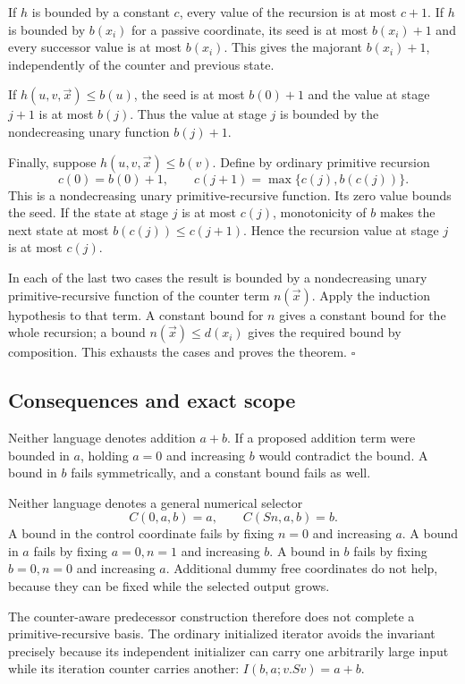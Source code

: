 \documentclass[11pt,letterpaper]{article}
\theoremstyle{definition}\newtheorem{definition}[theorem]{Definition}
\theoremstyle{remark}\newtheorem{remark}[theorem]{Remark}
\begin{document}
If $h$ is bounded by a constant $c$, every value of the recursion is
at most $c+1$.  If $h$ is bounded by $b(x_i)$ for a passive coordinate,
its seed is at most $b(x_i)+1$ and every successor value is at most
$b(x_i)$.  This gives the majorant $b(x_i)+1$, independently of the
counter and previous state.

If $h(u,v,\vec x)\leq b(u)$, the seed is at most $b(0)+1$ and
the value at stage $j+1$ is at most $b(j)$.  Thus the value at stage
$j$ is bounded by the nondecreasing unary function $b(j)+1$.

Finally, suppose $h(u,v,\vec x)\leq b(v)$.  Define by ordinary
primitive recursion
\[
 c(0)=b(0)+1,\qquad
 c(j+1)=\max\{c(j),b(c(j))\}.
\]
This is a nondecreasing unary primitive-recursive function.  Its zero
value bounds the seed.  If the state at stage $j$ is at most $c(j)$,
monotonicity of $b$ makes the next state at most $b(c(j))\leq c(j+1)$.
Hence the recursion value at stage $j$ is at most $c(j)$.

In each of the last two cases the result is bounded by a nondecreasing
unary primitive-recursive function of the counter term $n(\vec x)$.
Apply the induction hypothesis to that term.  A constant bound for $n$
gives a constant bound for the whole recursion; a bound
$n(\vec x)\leq d(x_i)$ gives the required bound by composition.
This exhausts the cases and proves the theorem.
\hfill$\square$

\subsection{Consequences and exact scope}

Neither language denotes addition $a+b$.  If a proposed addition term
were bounded in $a$, holding $a=0$ and increasing $b$ would contradict
the bound.  A bound in $b$ fails symmetrically, and a constant bound
fails as well.

Neither language denotes a general numerical selector
\[
 C(0,a,b)=a,\qquad C(Sn,a,b)=b.
\]
A bound in the control coordinate fails by fixing $n=0$ and increasing
$a$.  A bound in $a$ fails by fixing $a=0,n=1$ and increasing $b$.
A bound in $b$ fails by fixing $b=0,n=0$ and increasing $a$.
Additional dummy free coordinates do not help, because they can be
fixed while the selected output grows.

The counter-aware predecessor construction therefore does not complete
a primitive-recursive basis.  The ordinary initialized iterator avoids
the invariant precisely because its independent initializer can carry
one arbitrarily large input while its iteration counter carries another:
$I(b,a;v.Sv)=a+b$.
\end{document}
